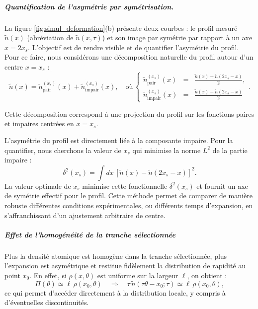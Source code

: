 \subparagraph{Quantification de l’asymétrie par symétrisation.}
La figure \ref{fig:simul_deformation}(b) présente deux courbes : le profil mesuré $\tilde{n}(x)$ (abréviation de $\tilde{n}(x,\tau)$) et son image par symétrie par rapport à un axe $x = 2x_s$. L’objectif est de rendre visible et de quantifier l’asymétrie du profil.
Pour ce faire, nous considérons une décomposition naturelle du profil autour d’un centre $x = x_s$ :
\begin{equation}
\tilde{n}(x) = \tilde{n}_{\text{pair}}^{(x_s)}(x) + \tilde{n}_{\text{impair}}^{(x_s)}(x),\quad \mbox{où} \, \left\{\begin{array}{lcr}\tilde{n}_{\text{pair}}^{(x_s)}(x) &=&  \displaystyle \frac{\tilde{n}(x) + \tilde{n}(2x_s - x)}{2} , \\ \tilde{n}_{\text{impair}}^{(x_s)}(x) &=& \displaystyle \frac{\tilde{n}(x) - \tilde{n}(2x_s - x) }{2}\end{array} \right. .
\end{equation}

Cette décomposition correspond à une projection du profil sur les fonctions paires et impaires centrées en $x = x_s$.

L’asymétrie du profil est directement liée à la composante impaire. Pour la quantifier, nous cherchons la valeur de $x_s$ qui minimise la norme $L^2$ de la partie impaire :
\begin{equation}
\mathcal{\delta}^2(x_s) = \int dx\, \left[\tilde{n}(x) - \tilde{n}(2x_s - x)\right]^2.
\end{equation}
La valeur optimale de $x_s$ minimise cette fonctionnelle $\mathcal{\delta}^2(x_s)$ et fournit un axe de symétrie effectif pour le profil. Cette méthode permet de comparer de manière robuste différentes conditions expérimentales, ou différents temps d’expansion, en s’affranchissant d’un ajustement arbitraire de centre.


\subparagraph{Effet de l’homogénéité de la tranche sélectionnée}

Plus la densité atomique est homogène dans la tranche sélectionnée, plus l’expansion est asymétrique et restitue fidèlement la distribution de rapidité au point $x_0$. En effet, si $\rho(x,\theta)$ est uniforme sur la largeur $\ell$, on obtient :
\begin{equation}
\Pi(\theta) \simeq \ell\, \rho(x_0,\theta) \quad \Rightarrow \quad \tau\, \tilde{n}(\tau \theta - x_0 ; \tau) \simeq \ell\, \rho(x_0,\theta),
\end{equation}
ce qui permet d’accéder directement à la distribution locale, y compris à d’éventuelles discontinuités.

